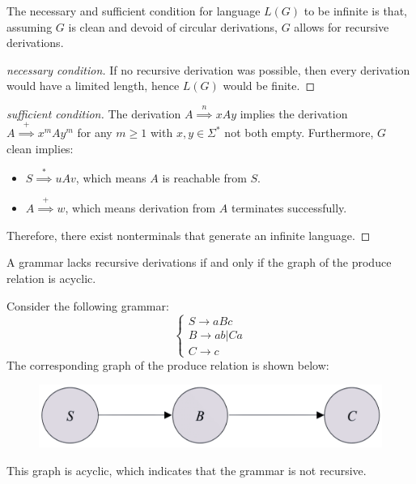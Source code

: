 The necessary and sufficient condition for language $L(G)$ to be infinite is that, assuming $G$ is clean and devoid of circular derivations, $G$ allows for recursive derivations.
\begin{proof}[necessary condition]
    If no recursive derivation was possible, then every derivation would have a limited length, hence $L(G)$ would be finite. 
\end{proof}
\begin{proof}[sufficient condition]
    The derivation $A\overset{n}{\implies}xAy$ implies the derivation $A\overset{+}{\implies}x^mAy^m$ for any $m \geq 1$ with $x,y \in \Sigma^{*}$ not both empty. 
    Furthermore, $G$ clean implies: 
    \begin{itemize}
        \item $S\overset{*}{\implies}uAv$, which means $A$ is reachable from $S$. 
        \item $A\overset{+}{\implies}w$, which means derivation from $A$ terminates successfully. 
    \end{itemize}
    Therefore, there exist nonterminals that generate an infinite language.
\end{proof}
\begin{property}
    A grammar lacks recursive derivations if and only if the graph of the produce relation is acyclic.
\end{property}
\begin{example}
    Consider the following grammar:
    \[
    \begin{cases}
        S \rightarrow aBc \\
        B \rightarrow ab | Ca \\
        C \rightarrow c
    \end{cases}
    \]
    The corresponding graph of the produce relation is shown below:
    \begin{figure}[H]
        \centering
        \includegraphics[width=0.5\linewidth]{images/produce.png}
    \end{figure}
    This graph is acyclic, which indicates that the grammar is not recursive.
\end{example}
\newpage